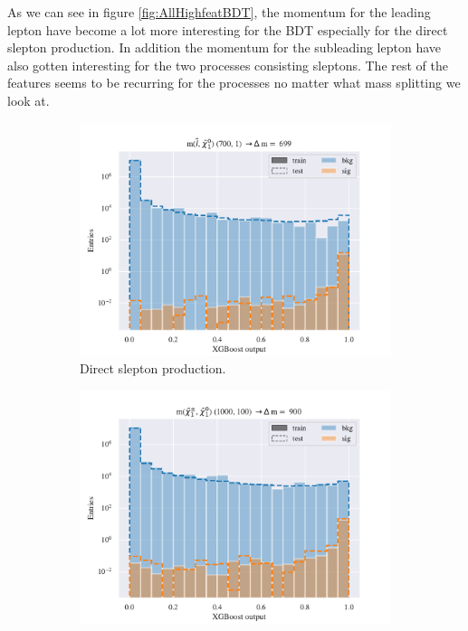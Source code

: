 As we can see in figure \ref{fig:AllHighfeatBDT}, the momentum for the leading lepton have become a lot more interesting for the BDT especially for the direct slepton production. In addition the momentum for the subleading lepton have also gotten interesting for the two processes consisting sleptons. The rest of the features seems to be recurring for the processes no matter what mass splitting we look at. 



\begin{figure}[H]
    \centering
    \begin{subfigure}[t!]{0.49\textwidth}
        \includegraphics[width = \textwidth]{Figures/SlepSlep/ML/BDT/All_level/High/scaled_train_test_396033.pdf}
        \caption{Direct slepton production.}
        \label{fig:SlepslepHigh}
    \end{subfigure}
    \begin{subfigure}[t!]{0.49\textwidth}
        \includegraphics[width = \textwidth]{Figures/SlepSnu/BDT/All_level/High/scaled_train_test_397169.pdf}

\end{subfigure}
\end{figure}
